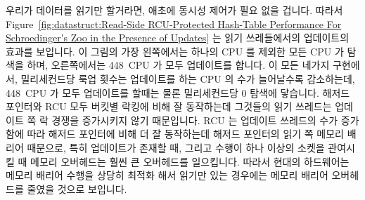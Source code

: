 우리가 데이터를 읽기만 할거라면, 애초에 동시성 제어가 필요 없을 겁니다.
따라서
Figure~\ref{fig:datastruct:Read-Side RCU-Protected Hash-Table Performance For Schroedinger's Zoo in the Presence of Updates}
는 읽기 쓰레들에서의 업데이트의 효과를 보입니다.
이 그림의 가장 왼쪽에서는 하나의 CPU 를 제외한 모든 CPU 가 탐색을 하며,
오른쪽에서는 448~CPU 가 모두 업데이트를 합니다.
이 모든 네가지 구현에서, 밀리세컨드당 룩업 횟수는 업데이트를 하는 CPU 의 수가
늘어날수록 감소하는데, 448~CPU 가 모두 업데이트를 할때는 물론 밀리세컨드당 0
탐색에 닿습니다.
해저드 포인터와 RCU 모두 버킷별 락킹에 비해 잘 동작하는데 그것들의 읽기
쓰레드는 업데이트 쪽 락 경쟁을 증가시키지 않기 때문입니다.
RCU 는 업데이트 쓰레드의 수가 증가함에 따라 해저드 포인터에 비해 더 잘
동작하는데 해저드 포인터의 읽기 쪽 메모리 배리어 때문으로, 특히 업데이트가
존재할 때, 그리고 수행이 하나 이상의 소켓을 관여시킬 때 메모리 오버헤드는 훨씬
큰 오버헤드를 일으킵니다.
따라서 현대의 하드웨어는 메모리 배리어 수행을 상당히 최적화 해서 읽기만 있는
경우에는 메모리 배리어 오버헤드를 줄였을 것으로 보입니다.

